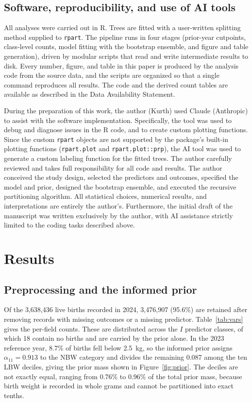 \documentclass[AMA]{USG}
\begin{document}
\subsection{Software, reproducibility, and use of AI tools}
\label{sec:methods-software}

All analyses were carried out in R. Trees are fitted with a user-written
splitting method supplied to \texttt{rpart}. The pipeline runs in four stages
(prior-year cutpoints, class-level counts, model fitting with the bootstrap
ensemble, and figure and table generation), driven by modular scripts that read and write intermediate results to disk. Every number, figure, and table in this paper is produced by the analysis code from the source data, and the scripts are organized so that a single command reproduces all results. The code and the derived count tables are available as described in the Data Availability Statement.

During the preparation of this work, the author (Kurth) used Claude (Anthropic) to assist with the software implementation. Specifically, the tool was used to debug and diagnose issues in the R code, and to create custom plotting functions. Since the custom \texttt{rpart} objects are not supported by the package's built-in plotting functions (\texttt{rpart.plot} and \texttt{rpart.plot::prp}), the AI tool was used to generate a custom labeling function for the fitted trees. The author carefully reviewed and takes full responsibility for all code and results. 
The author conceived the study design, selected the predictors and outcomes, specified the model and prior, designed the bootstrap ensemble, and executed the recursive partitioning algorithm. All statistical choices, numerical results, and interpretations are entirely the author's. Furthermore, the initial draft of the manuscript was written exclusively by the author, with AI assistance strictly limited to the coding tasks described above.

\section{Results}
\label{sec:results}

\subsection{Preprocessing and the informed prior}

Of the 3,638,436 live births recorded in 2024, 3,476,907 (95.6\%) are retained after removing records with missing outcomes or a missing predictor. Table~\ref{tab:vars} gives the per-field counts. These are distributed across the \(I\) predictor classes, of which 18 contain no births and are carried by the prior alone. In the 2023 reference year, 8.7\% of births fell below 2.5~kg, so the informed prior assigns \(\alpha_{11} = 0.913\) to the NBW category and divides the remaining 0.087 among the ten LBW deciles, giving the prior mass shown in Figure~\ref{fig:prior}. The deciles are not exactly equal, ranging from 0.76\% to 0.96\% of the total prior mass, because birth weight is recorded in whole grams and cannot be partitioned into exact tenths.
\end{document}

